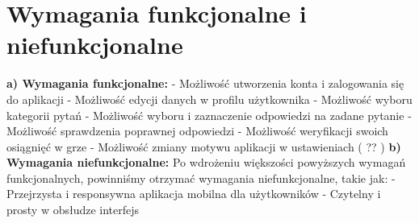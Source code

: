 	\newpage
\section{Wymagania funkcjonalne i niefunkcjonalne}		%

\textbf{a) Wymagania funkcjonalne:}
\newline - Możliwość utworzenia konta i zalogowania się do aplikacji
\newline - Możliwość edycji danych w profilu użytkownika
\newline - Możliwość wyboru kategorii pytań 
\newline - Możliwość wyboru i zaznaczenie odpowiedzi na zadane pytanie
\newline - Możliwość sprawdzenia poprawnej odpowiedzi 
\newline - Możliwość weryfikacji swoich osiągnięć w grze
\newline - Możliwość zmiany motywu aplikacji w ustawieniach ( ?? )
\newline\newline\textbf{b) Wymagania niefunkcjonalne:}
\newline Po wdrożeniu większości powyższych wymagań funkcjonalnych, powinniśmy otrzymać wymagania niefunkcjonalne, takie jak:
\newline - Przejrzysta i responsywna aplikacja mobilna dla użytkowników 
\newline - Czytelny i prosty w obsłudze interfejs
